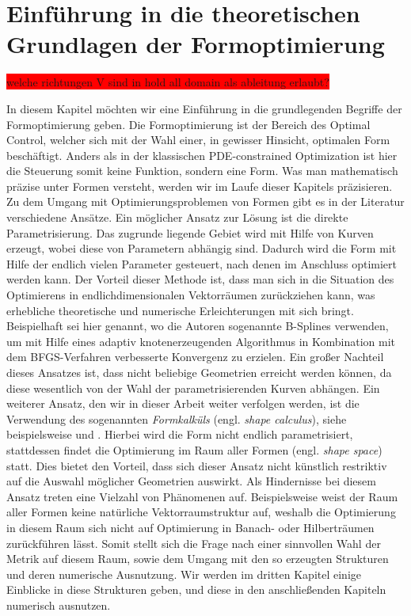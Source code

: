 


\section{Einführung in die theoretischen Grundlagen der Formoptimierung}
\label{Chapter_formopt}
\colorbox{red}{welche richtungen V sind in hold all domain als ableitung erlaubt?}

In diesem Kapitel möchten wir eine Einführung in die grundlegenden Begriffe der Formoptimierung geben.
Die Formoptimierung ist der Bereich des Optimal Control, welcher sich mit der Wahl einer, in gewisser Hinsicht, optimalen Form beschäftigt. Anders als in der klassischen PDE-constrained Optimization ist hier die Steuerung somit keine Funktion, sondern eine Form. Was man mathematisch präzise unter Formen versteht, werden wir im Laufe dieser Kapitels präzisieren.
Zu dem Umgang mit Optimierungsproblemen von Formen gibt es in der Literatur verschiedene Ansätze. \newline
Ein möglicher Ansatz zur Lösung ist die direkte Parametrisierung. Das zugrunde liegende Gebiet wird mit Hilfe von Kurven erzeugt, wobei diese von Parametern abhängig sind. Dadurch wird die Form mit Hilfe der endlich vielen Parameter gesteuert, nach denen im Anschluss optimiert werden kann. Der Vorteil dieser Methode ist, dass man sich in die Situation des Optimierens in endlichdimensionalen Vektorräumen zurückziehen kann, was erhebliche theoretische und numerische Erleichterungen mit sich bringt. Beispielhaft sei hier \cite{b-spline} genannt, wo die Autoren sogenannte B-Splines verwenden, um mit Hilfe eines adaptiv knotenerzeugenden Algorithmus in Kombination mit dem BFGS-Verfahren verbesserte Konvergenz zu erzielen. Ein großer Nachteil dieses Ansatzes ist, dass nicht beliebige Geometrien erreicht werden können, da diese wesentlich von der Wahl der parametrisierenden Kurven abhängen. \newline
Ein weiterer Ansatz, den wir in dieser Arbeit weiter verfolgen werden, ist die Verwendung des sogenannten \textit{Formkalküls} (engl. \textit{shape calculus}), siehe beispielsweise \cite{Shape_diff} und \cite{shapeopt}. Hierbei wird die Form nicht endlich parametrisiert, stattdessen findet die Optimierung im Raum aller Formen (engl. \textit{shape space}) statt. Dies bietet den Vorteil, dass sich dieser Ansatz nicht künstlich restriktiv auf die Auswahl möglicher Geometrien auswirkt. Als Hindernisse bei diesem Ansatz treten eine Vielzahl von Phänomenen auf. Beispielsweise weist der Raum aller Formen keine natürliche Vektorraumstruktur auf, weshalb die Optimierung in diesem Raum sich nicht auf Optimierung in Banach- oder Hilberträumen zurückführen lässt. Somit stellt sich die Frage nach einer sinnvollen Wahl der Metrik auf diesem Raum, sowie dem Umgang mit den so erzeugten Strukturen und deren numerische Ausnutzung. Wir werden im dritten Kapitel einige Einblicke in diese Strukturen geben, und diese in den anschließenden Kapiteln numerisch ausnutzen.
